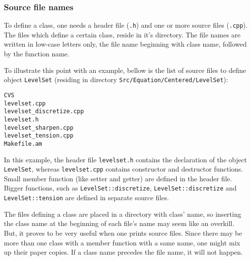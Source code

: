 \subsubsection{Source file names}

To define a class, one needs a header file ({\tt .h}) and one or more
source files ({\tt .cpp}). The files which define a certain class, 
reside in it's directory. The file names are written in low-case letters only,
the file name beginning with class name, followed by the function name. 

To illustrate this point with an example, bellow is the list of source files to
define object {\tt LevelSet} 
(residing in directory {\tt Src/Equation/Centered/LevelSet}):
%
{\small \begin{verbatim}
CVS
levelset.cpp
levelset_discretize.cpp
levelset.h
levelset_sharpen.cpp
levelset_tension.cpp
Makefile.am
\end{verbatim}}
%
In this example, the header file {\tt levelset.h} contains the declaration of 
the object {\tt LevelSet}, whereas {\tt levelset.cpp} contains constructor and 
destructor functions. Small member function (like setter and getter) are defined 
in the header file. Bigger functions, such as {\tt LevelSet::discretize}, 
{\tt LevelSet::discretize} and {\tt LevelSet::tension} are defined in separate
source files. 

The files defining a class are placed in a directory with class' name, so 
inserting the class name at the beginning of each file's name may seem like an
overkill. But, it proves to be very useful when one prints source files. Since
there may be more than one class with a member function with a same name, one
might mix up their paper copies. If a class name precedes the file name, it
will not happen. 

